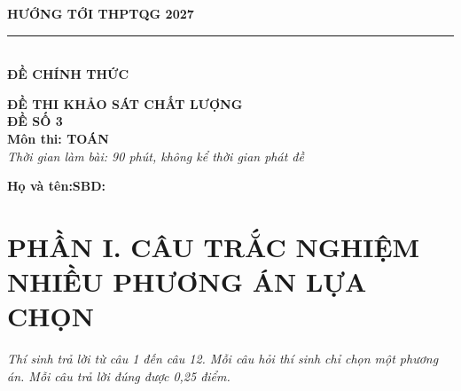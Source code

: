 \documentclass[12pt,a4paper]{article}
\begin{document}
\noindent
\begin{minipage}[t]{0.40\textwidth}
    \centering
    \textbf{HƯỚNG TỚI THPTQG 2027}\\[-2pt]
    \rule{3.2cm}{0.6pt}\\[4pt]
    \textbf{ĐỀ CHÍNH THỨC}
\end{minipage}\hfill
\begin{minipage}[t]{0.58\textwidth}
    \centering
    \textbf{ĐỀ THI KHẢO SÁT CHẤT LƯỢNG}\\
    \textbf{ĐỀ SỐ 3}\\
    \textbf{Môn thi: TOÁN}\\
    \textit{\small Thời gian làm bài: 90 phút, không kể thời gian phát đề}
\end{minipage}

\vspace{0.2cm}
\noindent
\begin{minipage}[b]{0.78\textwidth}
    \textbf{Họ và tên:}\dotfill\textbf{SBD:}\makebox[3.5cm]{\dotfill}
\end{minipage}\hfill
\begin{minipage}[b]{0.20\textwidth}
    \hfill
    \setlength{\fboxrule}{0.8pt}%
\end{minipage}
\vspace{0.2cm}

\section*{\large PHẦN I. CÂU TRẮC NGHIỆM NHIỀU PHƯƠNG ÁN LỰA CHỌN}
\textit{Thí sinh trả lời từ câu 1 đến câu 12. Mỗi câu hỏi thí sinh chỉ chọn một phương án. Mỗi câu trả lời đúng được 0,25 điểm.}
\end{document}
